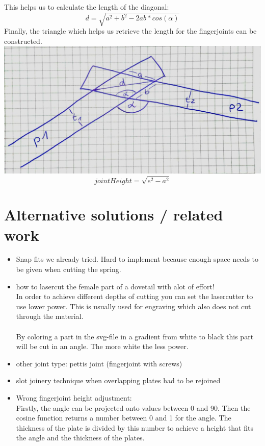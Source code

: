 \documentclass[../ClassicThesis.tex]{subfiles}
\begin{document}
    This helps us to calculate the length of the diagonal:
    $$ d = \sqrt{a^2 + b^2 - 2ab * cos(\alpha)}$$
    Finally, the triangle which helps us retrieve the length for the fingerjoints can be constructed. \\
    \includegraphics[width=0.5\columnwidth]{Images/06-2-joints-newJointHeight3.jpg}\\
    $$ jointHeight = \sqrt{e^2 - a^2} $$
    
    

\section{Alternative solutions / related work}
    \begin{itemize}
        \item Snap fits we already tried. Hard to implement because enough space needs to be given when cutting the spring.
        \item how to lasercut the female part of a dovetail with alot of effort!\\
        In order to achieve different depths of cutting you can set the lasercutter to use lower power. This is usually used for engraving which also does not cut through the material.\\  
        \\
        By coloring a part in the svg-file in a gradient from white to black this part will be cut in an angle. The more white the less power.
        \item other joint type: pettis joint (fingerjoint with screws)
        \item slot joinery technique when overlapping plates had to be rejoined
        \item Wrong fingerjoint height adjustment:\\
        Firstly, the angle can be projected onto values between 0 and 90. Then the cosine function returns a number between 0 and 1 for the angle. The thickness of the plate is divided by this number to achieve a height that fits the angle and the thickness of the plates. \\
    \end{itemize}
    
\end{document}
